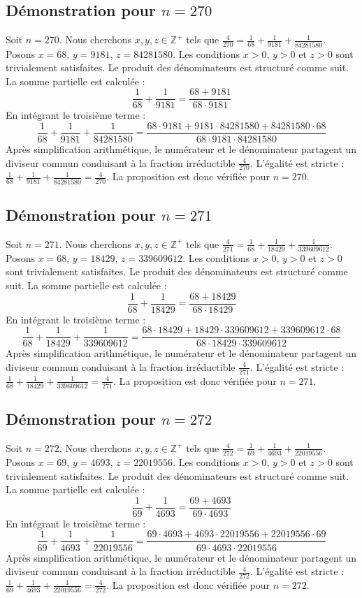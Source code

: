 \documentclass[11pt,a4paper]{article}
\begin{document}
\subsection{Démonstration pour $n = 270$}
Soit $n = 270$. Nous cherchons $x, y, z \in \mathbb{Z}^{+}$ tels que $\frac{4}{270} = \frac{1}{68} + \frac{1}{9181} + \frac{1}{84281580}$.
Posons $x = 68$, $y = 9181$, $z = 84281580$.
Les conditions $x > 0$, $y > 0$ et $z > 0$ sont trivialement satisfaites.
Le produit des dénominateurs est structuré comme suit. La somme partielle est calculée :
$$ \frac{1}{68} + \frac{1}{9181} = \frac{68+9181}{68 \cdot 9181} $$
En intégrant le troisième terme :
$$ \frac{1}{68} + \frac{1}{9181} + \frac{1}{84281580} = \frac{68 \cdot 9181 + 9181 \cdot 84281580 + 84281580 \cdot 68}{68 \cdot 9181 \cdot 84281580} $$
Après simplification arithmétique, le numérateur et le dénominateur partagent un diviseur commun conduisant à la fraction irréductible $\frac{4}{270}$.
L'égalité est stricte : $\frac{1}{68} + \frac{1}{9181} + \frac{1}{84281580} = \frac{4}{270}$.
La proposition est donc vérifiée pour $n = 270$.
\subsection{Démonstration pour $n = 271$}
Soit $n = 271$. Nous cherchons $x, y, z \in \mathbb{Z}^{+}$ tels que $\frac{4}{271} = \frac{1}{68} + \frac{1}{18429} + \frac{1}{339609612}$.
Posons $x = 68$, $y = 18429$, $z = 339609612$.
Les conditions $x > 0$, $y > 0$ et $z > 0$ sont trivialement satisfaites.
Le produit des dénominateurs est structuré comme suit. La somme partielle est calculée :
$$ \frac{1}{68} + \frac{1}{18429} = \frac{68+18429}{68 \cdot 18429} $$
En intégrant le troisième terme :
$$ \frac{1}{68} + \frac{1}{18429} + \frac{1}{339609612} = \frac{68 \cdot 18429 + 18429 \cdot 339609612 + 339609612 \cdot 68}{68 \cdot 18429 \cdot 339609612} $$
Après simplification arithmétique, le numérateur et le dénominateur partagent un diviseur commun conduisant à la fraction irréductible $\frac{4}{271}$.
L'égalité est stricte : $\frac{1}{68} + \frac{1}{18429} + \frac{1}{339609612} = \frac{4}{271}$.
La proposition est donc vérifiée pour $n = 271$.
\subsection{Démonstration pour $n = 272$}
Soit $n = 272$. Nous cherchons $x, y, z \in \mathbb{Z}^{+}$ tels que $\frac{4}{272} = \frac{1}{69} + \frac{1}{4693} + \frac{1}{22019556}$.
Posons $x = 69$, $y = 4693$, $z = 22019556$.
Les conditions $x > 0$, $y > 0$ et $z > 0$ sont trivialement satisfaites.
Le produit des dénominateurs est structuré comme suit. La somme partielle est calculée :
$$ \frac{1}{69} + \frac{1}{4693} = \frac{69+4693}{69 \cdot 4693} $$
En intégrant le troisième terme :
$$ \frac{1}{69} + \frac{1}{4693} + \frac{1}{22019556} = \frac{69 \cdot 4693 + 4693 \cdot 22019556 + 22019556 \cdot 69}{69 \cdot 4693 \cdot 22019556} $$
Après simplification arithmétique, le numérateur et le dénominateur partagent un diviseur commun conduisant à la fraction irréductible $\frac{4}{272}$.
L'égalité est stricte : $\frac{1}{69} + \frac{1}{4693} + \frac{1}{22019556} = \frac{4}{272}$.
La proposition est donc vérifiée pour $n = 272$.
\end{document}

